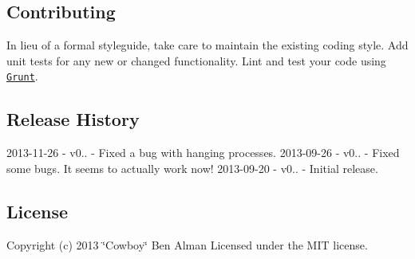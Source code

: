 \subsection*{Contributing}

In lieu of a formal styleguide, take care to maintain the existing coding style. Add unit tests for any new or changed functionality. Lint and test your code using \href{http://gruntjs.com/}{\tt Grunt}.

\subsection*{Release History}

2013-\/11-\/26 -\/ v0.. -\/ Fixed a bug with hanging processes. 2013-\/09-\/26 -\/ v0.. -\/ Fixed some bugs. It seems to actually work now! 2013-\/09-\/20 -\/ v0.. -\/ Initial release.

\subsection*{License}

Copyright (c) 2013 \char`\"{}\+Cowboy\char`\"{} Ben Alman Licensed under the M\+IT license. 